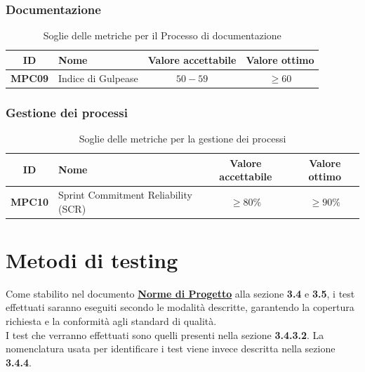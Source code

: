 \documentclass[a4paper,12pt]{article}
\begin{document}
\subsubsection{Documentazione}\label{sec:documentazione}
\begin{table}[H]
\centering
\renewcommand{\arraystretch}{1.5}
\begin{tabularx}{\textwidth}{|c|Y|c|c|}
\hline
{} \textbf{ID} & \textbf{Nome} & \textbf{Valore accettabile} & \textbf{Valore ottimo} \\ \hline
\textbf{MPC09} & Indice di Gulpease & $50-59$ & $\ge 60$ \\ \hline

\end{tabularx}
\caption{Soglie delle metriche per il Processo di documentazione}
\end{table}

\subsubsection{Gestione dei processi}\label{sec:gestione-processi}
\begin{table}[H]
\centering
\renewcommand{\arraystretch}{1.5}
\begin{tabularx}{\textwidth}{|c|Y|c|c|}
\hline
{} \textbf{ID} & \textbf{Nome} & \textbf{Valore accettabile} & \textbf{Valore ottimo} \\ \hline

\textbf{MPC10} & Sprint Commitment Reliability (SCR) & $\ge 80\%$ & $\ge 90\%$ \\ \hline

\end{tabularx}
\caption{Soglie delle metriche per la gestione dei processi}
\end{table}

\section{Metodi di testing} \label{sec:metodi_testing}
Come stabilito nel documento \href{https://swe-bitbybit.github.io/SWE-docs/docs/RTB/documenti_interni/norme_di_progetto.pdf}{\textbf{Norme di Progetto}} alla sezione \textbf{3.4} e \textbf{3.5}, i test effettuati saranno eseguiti secondo le modalità descritte, garantendo la copertura richiesta e la conformità agli standard di qualità.\\
I test che verranno effettuati sono quelli presenti nella sezione \textbf{3.4.3.2}. La nomenclatura usata per identificare i test viene invece descritta nella sezione \textbf{3.4.4}.\\
\end{document}
